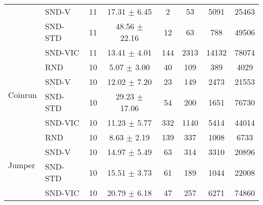 \documentclass[a4paper,11pt]{elsarticle}
\begin{document}
\begin{table}[t!]
\begin{tabular}{l|l|cccccc}
& \multicolumn{1}{l|}{SND-V} & \multicolumn{1}{c}{11} & \multicolumn{1}{c}{17.31 $\pm$ 6.45} & \multicolumn{1}{c}{2} & \multicolumn{1}{c}{53} & \multicolumn{1}{c}{5091} & \multicolumn{1}{c}{25463} \\
& \multicolumn{1}{l|}{SND-STD} & \multicolumn{1}{c}{11} & \multicolumn{1}{c}{48.56 $\pm$ 22.16} & \multicolumn{1}{c}{12} & \multicolumn{1}{c}{63} & \multicolumn{1}{c}{788} & \multicolumn{1}{c}{49506} \\
& \multicolumn{1}{l|}{SND-VIC} & \multicolumn{1}{c}{11} & \multicolumn{1}{c}{13.41 $\pm$ 4.01} & \multicolumn{1}{c}{144} & \multicolumn{1}{c}{2313} & \multicolumn{1}{c}{14132} & \multicolumn{1}{c}{78074} \\
\hline \multirow{4}{*}{Coinrun}
& \multicolumn{1}{l|}{RND} & \multicolumn{1}{c}{10} & \multicolumn{1}{c}{5.07 $\pm$ 3.00} & \multicolumn{1}{c}{40} & \multicolumn{1}{c}{109} & \multicolumn{1}{c}{389} & \multicolumn{1}{c}{4029} \\
& \multicolumn{1}{l|}{SND-V} & \multicolumn{1}{c}{10} & \multicolumn{1}{c}{12.02 $\pm$ 7.20} & \multicolumn{1}{c}{23} & \multicolumn{1}{c}{149} & \multicolumn{1}{c}{2473} & \multicolumn{1}{c}{21553} \\
& \multicolumn{1}{l|}{SND-STD} & \multicolumn{1}{c}{10} & \multicolumn{1}{c}{29.23 $\pm$ 17.06} & \multicolumn{1}{c}{54} & \multicolumn{1}{c}{200} & \multicolumn{1}{c}{1651} & \multicolumn{1}{c}{76730} \\
& \multicolumn{1}{l|}{SND-VIC} & \multicolumn{1}{c}{10} & \multicolumn{1}{c}{11.23 $\pm$ 5.77} & \multicolumn{1}{c}{332} & \multicolumn{1}{c}{1140} & \multicolumn{1}{c}{5414} & \multicolumn{1}{c}{44014} \\
\hline \multirow{4}{*}{Jumper}
& \multicolumn{1}{l|}{RND} & \multicolumn{1}{c}{10} & \multicolumn{1}{c}{8.63 $\pm$ 2.19} & \multicolumn{1}{c}{139} & \multicolumn{1}{c}{337} & \multicolumn{1}{c}{1008} & \multicolumn{1}{c}{6733} \\
& \multicolumn{1}{l|}{SND-V} & \multicolumn{1}{c}{10} & \multicolumn{1}{c}{14.97 $\pm$ 5.49} & \multicolumn{1}{c}{63} & \multicolumn{1}{c}{314} & \multicolumn{1}{c}{3310} & \multicolumn{1}{c}{20896} \\
& \multicolumn{1}{l|}{SND-STD} & \multicolumn{1}{c}{10} & \multicolumn{1}{c}{15.51 $\pm$ 3.73} & \multicolumn{1}{c}{61} & \multicolumn{1}{c}{189} & \multicolumn{1}{c}{1044} & \multicolumn{1}{c}{22008} \\
& \multicolumn{1}{l|}{SND-VIC} & \multicolumn{1}{c}{10} & \multicolumn{1}{c}{20.79 $\pm$ 6.18} & \multicolumn{1}{c}{47} & \multicolumn{1}{c}{257} & \multicolumn{1}{c}{6271} & \multicolumn{1}{c}{74860} \\
\hline\hline
\end{tabular}
\label{tab:analysis1}
\end{table}
\end{document}
